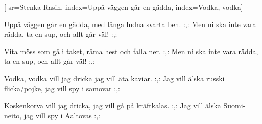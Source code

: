 [ 							
	sr={Stenka Rasin},					
	index={Uppå väggen går en gädda},
	index={Vodka, vodka}]		
	
\beginverse*						
Uppå väggen går en gädda, 
med långa ludna svarta ben.
:,: Men ni ska inte vara rädda,
ta en sup, och allt går väl! :,:
\endverse						

\beginverse				
Vita möss som gå i taket, 
råma hest och falla ner.
:,: Men ni ska inte vara rädda,
ta en sup, och allt går väl! :,:
\endverse
				
\beginverse				
Vodka, vodka vill jag dricka
jag vill äta kaviar.
:,: Jag vill älska russki flicka/pojke, 
jag vill spy i samovar :,:
\endverse	

\beginverse				
Koskenkorva vill jag dricka,
jag vill gå på kräftkalas.
:,: Jag vill älska Suomi-neito, 
jag vill spy i Aaltovas :,:
\endverse	
\endsong	
